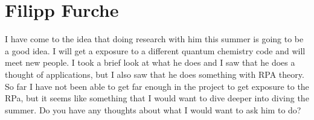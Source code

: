 \documentclass[12pt]{article}
\begin{document}
\section{Filipp Furche}
I have come to the idea that doing research with him this summer is going to be a good idea. I will get a exposure to a different quantum chemistry code and will meet new people. I took a brief look at what he does and I saw that he does a thought of applications, but I also saw that he does something with RPA theory. So far I have not been able to get far enough in the project to get exposure to the RPa, but it seems like something that I would want to dive deeper into diving the summer. Do you have any thoughts about what I would want to ask him to do?
\end{document}

